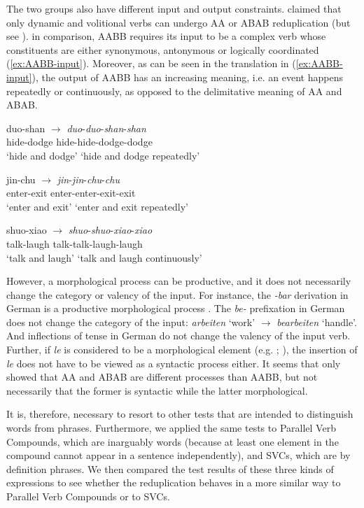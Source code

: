 The two groups also have different input and output constraints. \citet{Xie2020} claimed that only dynamic and volitional verbs can undergo AA or ABAB reduplication (but see ).
in comparison, AABB requires its input to be a complex verb whose constituents are either synonymous, antonymous or logically coordinated (\ref{ex:AABB-input}). 
Moreover, as can be seen in the translation in (\ref{ex:AABB-input}), the output of AABB has an increasing meaning, i.e. an event happens repeatedly or continuously, as opposed to the delimitative meaning of AA and ABAB.

\ea\label{ex:AABB-input}
  \ea \gll duo-shan $\rightarrow$ \textit{duo}-\textit{duo}-\textit{shan}-\textit{shan}\\
  hide-dodge {} hide-hide-dodge-dodge\\ 
  \glt `hide and dodge' `hide and dodge repeatedly'
  
  \ex \gll jin-chu $\rightarrow$ \textit{jin}-\textit{jin}-\textit{chu}-\textit{chu}\\
  enter-exit {} enter-enter-exit-exit\\ 
  \glt `enter and exit' `enter and exit repeatedly'
  
  \ex \gll shuo-xiao $\rightarrow$ \textit{shuo}-\textit{shuo}-\textit{xiao}-\textit{xiao}\\
  talk-laugh {} talk-talk-laugh-laugh\\ 
  \glt `talk and laugh' `talk and laugh continuously'
  \z
\z

However, a morphological process can be productive, and it does not necessarily change the category or valency of the input.
For instance, the \textit{-bar} derivation in German is a productive morphological process \citep[330]{Mueller2002}. 
The \textit{be-} prefixation in German does not change the category of the input: \textit{arbeiten} `work' $\rightarrow$ \textit{bearbeiten} `handle'. 
And inflections of tense in German do not change the valency of the input verb.
Further, if \textit{le} is considered to be a morphological element (e.g. \citealt[101--102]{Huangetal2009}; \citealt[246]{MuellerLipenkova2013}), the insertion of \textit{le} does not have to be viewed as a syntactic
process either.
It seems that \citet{Xie2020} only showed that AA and ABAB are different processes than AABB, but not necessarily that the former is syntactic while the latter morphological.

It is, therefore, necessary to resort to other tests that are intended to distinguish words from phrases. 
Furthermore, we applied the same tests to Parallel Verb Compounds, which are inarguably words (because at least one element in the compound cannot appear in a sentence independently), 
and {SVC}s, which are by definition phrases. 
We then compared the test results of these three kinds of expressions to see whether the reduplication behaves in a more similar way to Parallel Verb Compounds or to {SVC}s.



